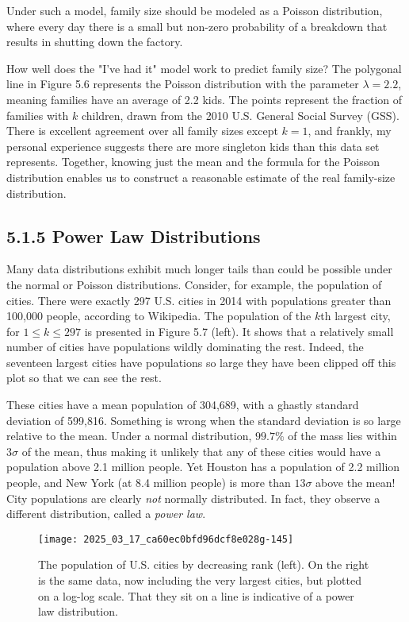 \documentclass[10pt]{article}
\begin{document}
Under such a model, family size should be modeled as a Poisson distribution, where every day there is a small but non-zero probability of a breakdown that results in shutting down the factory.

How well does the "I've had it" model work to predict family size? The polygonal line in Figure 5.6 represents the Poisson distribution with the parameter $\lambda=2.2$, meaning families have an average of 2.2 kids. The points represent the fraction of families with $k$ children, drawn from the 2010 U.S. General Social Survey (GSS). There is excellent agreement over all family sizes except $k=1$, and frankly, my personal experience suggests there are more singleton kids than this data set represents. Together, knowing just the mean and the formula for the Poisson distribution enables us to construct a reasonable estimate of the real family-size distribution.

\subsection*{5.1.5 Power Law Distributions}
Many data distributions exhibit much longer tails than could be possible under the normal or Poisson distributions. Consider, for example, the population of cities. There were exactly 297 U.S. cities in 2014 with populations greater than 100,000 people, according to Wikipedia. The population of the $k$th largest city, for $1 \leq k \leq 297$ is presented in Figure 5.7 (left). It shows that a relatively small number of cities have populations wildly dominating the rest. Indeed, the seventeen largest cities have populations so large they have been clipped off this plot so that we can see the rest.

These cities have a mean population of 304,689, with a ghastly standard deviation of 599,816. Something is wrong when the standard deviation is so large relative to the mean. Under a normal distribution, $99.7 \%$ of the mass lies within $3 \sigma$ of the mean, thus making it unlikely that any of these cities would have a population above 2.1 million people. Yet Houston has a population of 2.2 million people, and New York (at 8.4 million people) is more than $13 \sigma$ above the mean! City populations are clearly \textit{not} normally distributed. In fact, they observe a different distribution, called a \textit{power law}.

\begin{figure}[H]
\centering
\texttt{[image: 2025\_03\_17\_ca60ec0bfd96dcf8e028g-145]}
\caption{The population of U.S. cities by decreasing rank (left). On the right is the same data, now including the very largest cities, but plotted on a log-log scale. That they sit on a line is indicative of a power law distribution.}
\end{figure}
\end{document}
